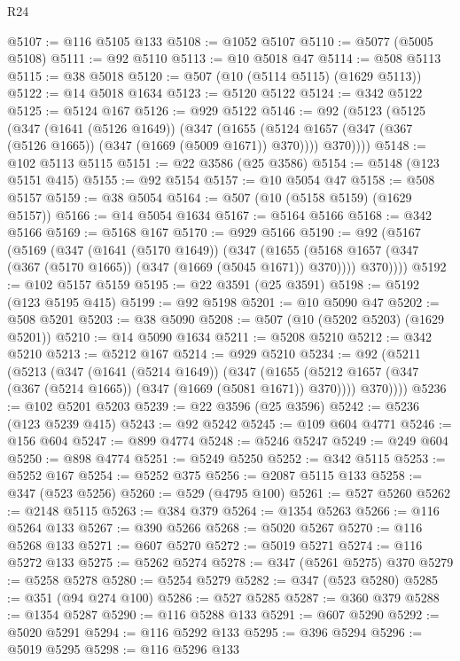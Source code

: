 \begin{lexlean}{R24}
\begin{coremodule}
{{{{{{{{{{{{{{{{{{{{{{{{{{{{{{{{{{{{{{{{{{{{{{{{{{{{{{{{{{{{{{{{{{{{{{{{{{{{{{{{{{{{{{{{{{{{{{{{{{{{{{{{{{{{{{{{{{{{{{{{{{{{{{{{{{{{{{{{{{{{{{{{{{{{{{{{{{{{{{{{{{{{{{{{{{{{{{{{{{{{{{{{{{{{{{{{{{{@5107 := @116 @5105 @133
@5108 := @1052 @5107
@5110 := @5077 (@5005 @5108)
@5111 := @92 @5110
@5113 := @10 @5018 @47
@5114 := @508 @5113
@5115 := @38 @5018
@5120 := @507 (@10 (@5114 @5115) (@1629 @5113))
@5122 := @14 @5018 @1634
@5123 := @5120 @5122
@5124 := @342 @5122
@5125 := @5124 @167
@5126 := @929 @5122
@5146 := @92
    (@5123
      (@5125
        (@347
          (@1641 (@5126 @1649))
          (@347
            (@1655 (@5124 @1657 (@347 (@367 (@5126 @1665)) (@347 (@1669 (@5009 @1671)) @370))))
            @370))))
@5148 := @102 @5113 @5115
@5151 := @22 @3586 (@25 @3586)
@5154 := @5148 (@123 @5151 @415)
@5155 := @92 @5154
@5157 := @10 @5054 @47
@5158 := @508 @5157
@5159 := @38 @5054
@5164 := @507 (@10 (@5158 @5159) (@1629 @5157))
@5166 := @14 @5054 @1634
@5167 := @5164 @5166
@5168 := @342 @5166
@5169 := @5168 @167
@5170 := @929 @5166
@5190 := @92
    (@5167
      (@5169
        (@347
          (@1641 (@5170 @1649))
          (@347
            (@1655 (@5168 @1657 (@347 (@367 (@5170 @1665)) (@347 (@1669 (@5045 @1671)) @370))))
            @370))))
@5192 := @102 @5157 @5159
@5195 := @22 @3591 (@25 @3591)
@5198 := @5192 (@123 @5195 @415)
@5199 := @92 @5198
@5201 := @10 @5090 @47
@5202 := @508 @5201
@5203 := @38 @5090
@5208 := @507 (@10 (@5202 @5203) (@1629 @5201))
@5210 := @14 @5090 @1634
@5211 := @5208 @5210
@5212 := @342 @5210
@5213 := @5212 @167
@5214 := @929 @5210
@5234 := @92
    (@5211
      (@5213
        (@347
          (@1641 (@5214 @1649))
          (@347
            (@1655 (@5212 @1657 (@347 (@367 (@5214 @1665)) (@347 (@1669 (@5081 @1671)) @370))))
            @370))))
@5236 := @102 @5201 @5203
@5239 := @22 @3596 (@25 @3596)
@5242 := @5236 (@123 @5239 @415)
@5243 := @92 @5242
@5245 := @109 @604 @4771
@5246 := @156 @604
@5247 := @899 @4774
@5248 := @5246 @5247
@5249 := @249 @604
@5250 := @898 @4774
@5251 := @5249 @5250
@5252 := @342 @5115
@5253 := @5252 @167
@5254 := @5252 @375
@5256 := @2087 @5115 @133
@5258 := @347 (@523 @5256)
@5260 := @529 (@4795 @100)
@5261 := @527 @5260
@5262 := @2148 @5115
@5263 := @384 @379
@5264 := @1354 @5263
@5266 := @116 @5264 @133
@5267 := @390 @5266
@5268 := @5020 @5267
@5270 := @116 @5268 @133
@5271 := @607 @5270
@5272 := @5019 @5271
@5274 := @116 @5272 @133
@5275 := @5262 @5274
@5278 := @347 (@5261 @5275) @370
@5279 := @5258 @5278
@5280 := @5254 @5279
@5282 := @347 (@523 @5280)
@5285 := @351 (@94 @274 @100)
@5286 := @527 @5285
@5287 := @360 @379
@5288 := @1354 @5287
@5290 := @116 @5288 @133
@5291 := @607 @5290
@5292 := @5020 @5291
@5294 := @116 @5292 @133
@5295 := @396 @5294
@5296 := @5019 @5295
@5298 := @116 @5296 @133
}}}}}}}}}}}}}}}}}}}}}}}}}}}}}}}}}}}}}}}}}}}}}}}}}}}}}}}}}}}}}}}}}}}}}}}}}}}}}}}}}}}}}}}}}}}}}}}}}}}}}}}}}}}}}}}}}}}}}}}}}}}}}}}}}}}}}}}}}}}}}}}}}}}}}}}}}}}}}}}}}}}}}}}}}}}}}}}}}}}}}}}}}}}}}}}}}}}
\end{coremodule}
\end{lexlean}
